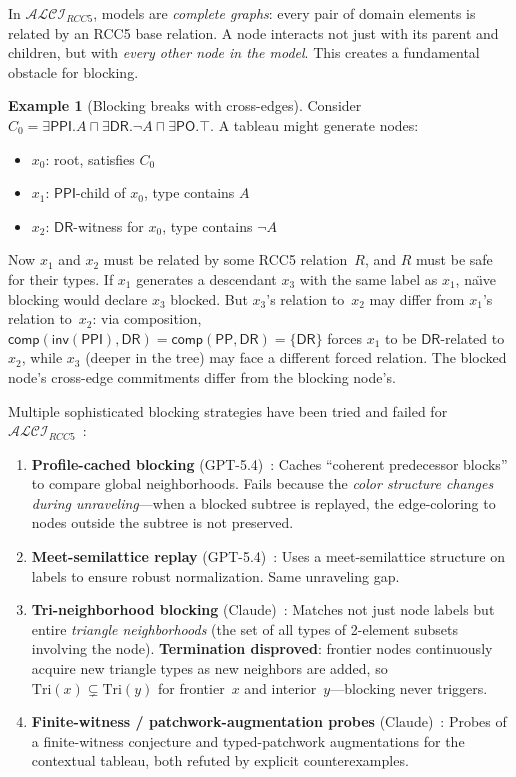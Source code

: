 \documentclass[
]{ceurart}
\theoremstyle{definition}
\newtheorem{examplex}[theorem]{Example}
\newcommand{\ALCIRCC}[1]{\ensuremath{\mathcal{ALCI}_{\mathit{RCC#1}}}}
\newcommand{\DR}{\ensuremath{\mathsf{DR}}}
\newcommand{\PO}{\ensuremath{\mathsf{PO}}}
\newcommand{\PP}{\ensuremath{\mathsf{PP}}}
\newcommand{\PPI}{\ensuremath{\mathsf{PPI}}}
\newcommand{\inv}{\ensuremath{\mathsf{inv}}}
\newcommand{\comp}{\ensuremath{\mathsf{comp}}}
\begin{document}
In $\ALCIRCC{5}$, models are \emph{complete graphs}: every pair
of domain elements is related by an RCC5 base relation.
A node interacts not just with its parent and children, but with
\emph{every other node in the model}.
This creates a fundamental obstacle for blocking.

\begin{examplex}[Blocking breaks with cross-edges]
\label{ex:blocking-fail}
Consider $C_0 = \exists\PPI.A \sqcap \exists\DR.\neg A
\sqcap \exists\PO.\top$.
A tableau might generate nodes:
\begin{itemize}[nosep]
  \item $x_0$: root, satisfies $C_0$
  \item $x_1$: $\PPI$-child of $x_0$, type contains $A$
  \item $x_2$: $\DR$-witness for $x_0$, type contains $\neg A$
\end{itemize}
Now $x_1$ and $x_2$ must be related by some RCC5 relation~$R$,
and $R$ must be safe for their types.  If $x_1$ generates a
descendant $x_3$ with the same label as $x_1$, na\"{\i}ve blocking
would declare $x_3$ blocked.  But $x_3$'s relation to~$x_2$ may
differ from $x_1$'s relation to~$x_2$: via composition,
$\comp(\inv(\PPI), \DR) = \comp(\PP, \DR) = \{\DR\}$ forces
$x_1$ to be $\DR$-related to~$x_2$, while $x_3$ (deeper in the
tree) may face a different forced relation.  The blocked node's
cross-edge commitments differ from the blocking node's.
\end{examplex}

Multiple sophisticated blocking strategies have been tried and
failed for $\ALCIRCC{5}$~\cite{ALCIRCC5Outdated,StatusAfterFW,ResponseGPTBlocking}:
\begin{enumerate}
  \item \textbf{Profile-cached blocking} (GPT-5.4)~\cite{ResponseGPTBlocking}: Caches
    ``coherent predecessor blocks'' to compare global neighborhoods.
    Fails because the \emph{color structure changes during
    unraveling}---when a blocked subtree is replayed, the
    edge-coloring to nodes outside the subtree is not preserved.
  \item \textbf{Meet-semilattice replay} (GPT-5.4)~\cite{ResponseGPTBlocking}: Uses a
    meet-semilattice structure on labels to ensure robust
    normalization.  Same unraveling gap.
  \item \textbf{Tri-neighborhood blocking} (Claude)~\cite{TriangleBlocking}: Matches not
    just node labels but entire \emph{triangle neighborhoods}
    (the set of all types of 2-element subsets involving the node).
    \textbf{Termination disproved}: frontier nodes continuously
    acquire new triangle types as new neighbors are added, so
    $\mathrm{Tri}(x) \subsetneq \mathrm{Tri}(y)$ for frontier~$x$
    and interior~$y$---blocking never triggers.
  \item \textbf{Finite-witness / patchwork-augmentation probes}
    (Claude)~\cite{FWProof,PatchworkAugmentation,TypedPatchworkCounterexample}:
    Probes of a finite-witness conjecture and typed-patchwork
    augmentations for the contextual tableau, both refuted by
    explicit counterexamples.
\end{enumerate}
\end{document}
